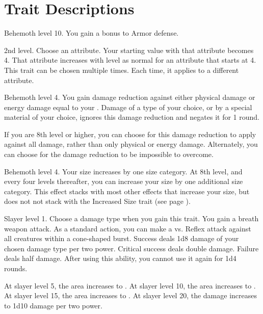     \twocolumn

\section{Trait Descriptions}

    \featpre Behemoth level 10.
    \featben You gain a  bonus to Armor defense.

    \featpre 2nd level.
    \featben Choose an attribute.
    Your starting value with that attribute becomes 4.
    That attribute increases with level as normal for an attribute that starts at 4.
     This trait can be chosen multiple times.
    Each time, it applies to a different attribute.

    \featpre Behemoth level 4.
    \featben You gain damage reduction against either physical damage or energy damage equal to your .
    Damage of a type of your choice, or by a special material of your choice, ignores this damage reduction and negates it for 1 round.

    If you are 8th level or higher, you can choose for this damage reduction to apply against all damage, rather than only physical or energy damage.
    Alternately, you can choose for the damage reduction to be impossible to overcome.

    \featpre Behemoth level 4.
    \featben Your size increases by one size category.
    At 8th level, and every four levels thereafter, you can increase your size by one additional size category.
    This effect stacks with most other effects that increase your size, but does not not stack with the Increased Size trait (see page ).

    \featpre Slayer level 1.
     Choose a damage type when you gain this trait.
    \featben You gain a breath weapon attack.
    As a standard action, you can make a  vs. Reflex attack against all creatures within a \areasmall cone-shaped burst.
    Success deals 1d8 damage of your chosen damage type per two power.
    Critical success deals double damage.
    Failure deals half damage.
    After using this ability, you cannot use it again for 1d4 rounds.

    At slayer level 5, the area increases to \areamed.
    At slayer level 10, the area increases to \arealarge.
    At slayer level 15, the area increases to \areahuge.
    At slayer level 20, the damage increases to 1d10 damage per two power.

